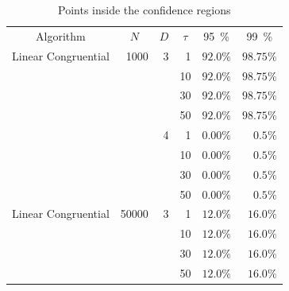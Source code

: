 \documentclass[12pt]{article}
\begin{document}
\begin{description}
\begin{table}[!h]
	\centering
	\caption{Points inside the confidence regions}
	\label{tab:result1}
	\begin{tabular}{c*{5}r}
		\toprule
		Algorithm & \multicolumn{1}{c}{$N$} & \multicolumn{1}{c}{$D$} & \multicolumn{1}{c}{$\tau$} & \multicolumn{1}{c}{\SI{95}{\percent}} & \multicolumn{1}{c}{\SI{99}{\percent}}\\
		\cmidrule(lr){1-1}
		\cmidrule(lr){2-2}
		\cmidrule(lr){3-3}
		\cmidrule(lr){4-4}
		\cmidrule(lr){5-5}
		\cmidrule(lr){6-6}
		Linear Congruential & 1000 & 3 & 1 & $92.0\%$ & $98.75\%$\\
		&  & & 10 & $92.0\%$ & $98.75\%$\\
		&  & & 30 & $92.0\%$ & $98.75\%$\\
		&  & & 50 & $92.0\%$ & $98.75\%$\\ 
		\cmidrule(lr){3-6}
		&  & 4 & 1 & $0.00\%$ & $0.5\%$\\
		&  &   & 10& $0.00\%$ & $0.5\%$\\
		&  &  & 30 & $0.00\%$ & $0.5\%$\\
		&  &  & 50 & $0.00\%$ & $0.5\%$\\
		\cmidrule(lr){1-6}
		Linear Congruential & 50000 & 3 & 1 & $12.0\%$ & $16.0\%$\\
		&  & & 10 & $12.0\%$ & $16.0\%$\\
		&  & & 30 & $12.0\%$ & $16.0\%$\\
		&  & & 50 & $12.0\%$ & $16.0\%$\\ 
		\bottomrule
	\end{tabular}
\end{table}


\end{description}
\end{document}
